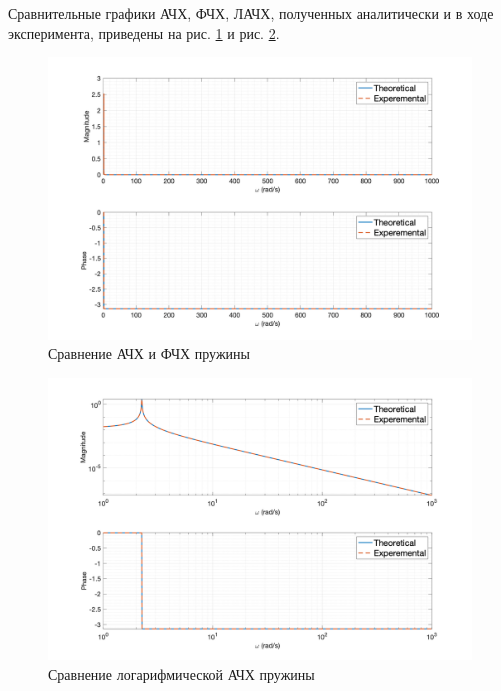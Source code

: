 Сравнительные графики АЧХ, ФЧХ, ЛАЧХ, полученных аналитически и в ходе эксперимента, приведены на рис. \ref{fig:task4_freq_resp_cmp_lin} и рис. \ref{fig:task4_freq_resp_cmp_loglog}.
\begin{figure}[ht!]
    \centering
    \includegraphics[width=\textwidth]{media/plots/task4_freq_resp_cmp_lin.png}
    \caption{Сравнение АЧХ и ФЧХ пружины}
    \label{fig:task4_freq_resp_cmp_lin}
\end{figure}
\begin{figure}[ht!]
    \centering
    \includegraphics[width=\textwidth]{media/plots/task4_freq_resp_cmp_loglog.png}
    \caption{Сравнение логарифмической АЧХ пружины}
    \label{fig:task4_freq_resp_cmp_loglog}
\end{figure}